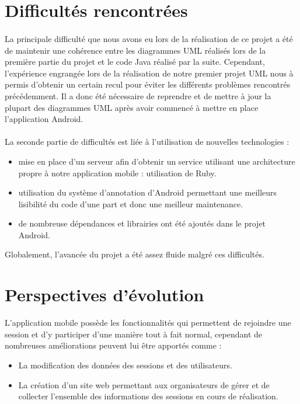 \documentclass[titlepage, 12pt]{report}
\begin{document}
\section{Difficultés rencontrées}

\paragraph{}La principale difficulté que nous avons eu lors de la réalisation de ce projet a été de maintenir une cohérence entre les diagrammes UML réalisés lors de la première partie du projet et le code Java réalisé par la suite. Cependant, l'expérience engrangée lors de la réalisation de notre premier projet UML nous à permis d'obtenir un certain recul pour éviter les différents problèmes rencontrés précédemment.
Il a donc été nécessaire de reprendre et de mettre à jour la plupart des diagrammes UML après avoir commencé à mettre en place l'application Android.

\paragraph{}La seconde partie de difficultés est liée à l'utilisation de nouvelles technologies :
\begin{itemize}
\item mise en place d'un serveur afin d'obtenir un service utilisant une architecture propre à notre application mobile : utilisation de Ruby.
\item utilisation du système d'annotation d'Android permettant une meilleurs lisibilité du code d'une part et donc une meilleur maintenance.
\item de nombreuse dépendances et librairies ont été ajoutés dans le projet Android. 
\end{itemize}

Globalement, l'avancée du projet a été assez fluide malgré ces difficultés.

\section{Perspectives d'évolution}

L'application mobile possède les fonctionnalités qui permettent de rejoindre une session et d'y participer d'une manière tout à fait normal, cependant de nombreuses améliorations peuvent lui être apportés comme :
\begin{itemize}
	\item La modification des données des sessions et des utilisateurs.
	\item La création d'un site web permettant aux organisateurs de gérer et de collecter l'ensemble des informations des sessions en cours de réalisation.
\end{itemize}
\end{document}
